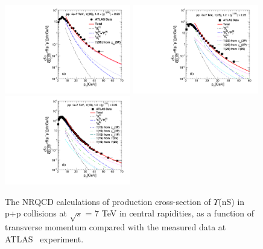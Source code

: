 \begin{figure}
  \centering
  \includegraphics[width=0.49\textwidth]{Figures/NRQCD_Beauty/Fig2a_Y3S_ATLAS_Rap12225.pdf}
  \includegraphics[width=0.49\textwidth]{Figures/NRQCD_Beauty/Fig5b_ATLAS_D2NDPtDy_Y2S_Y12225_Pt.pdf}
  \includegraphics[width=0.49\textwidth]{Figures/NRQCD_Beauty/Fig7b_ATLAS_D2NDPtDy_Y1S_Y12225_Pt.pdf}
  \caption{\small{The NRQCD calculations of production cross-section of $\Upsilon$(nS) in p+p collisions at 
      $\sqrt{s}$ = 7 TeV in central rapidities, as a function of transverse momentum compared with the measured data 
      at ATLAS~\cite{Aad:2012dlq} experiment.}}
  \label{Fig:SigmaYnSATLAS7TeV}
\end{figure}


